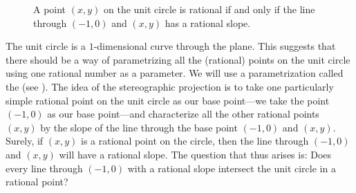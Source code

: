 \begin{figure}[t]
  \begin{center}
  \end{center}
  \caption[Stereographic projection]{A point $(x,y)$ on the unit circle is rational if and only if the line through $(-1,0)$ and $(x,y)$ has a rational slope.}
  \label{figure:stereographic-projection}
\end{figure}

The unit circle is a $1$-dimensional curve through the plane. This suggests that there should be a way of parametrizing all the (rational) points on the unit circle using one rational number as a parameter. We will use a parametrization called the  (see ). The idea of the stereographic projection is to take one particularly simple rational point on the unit circle as our base point---we take the point $(-1,0)$ as our base point---and characterize all the other rational points $(x,y)$ by the slope of the line through the base point $(-1,0)$ and $(x,y)$. Surely, if $(x,y)$ is a rational point on the circle, then the line through $(-1,0)$ and $(x,y)$ will have a rational slope. The question that thus arises is: Does every line through $(-1,0)$ with a rational slope intersect the unit circle in a rational point?

